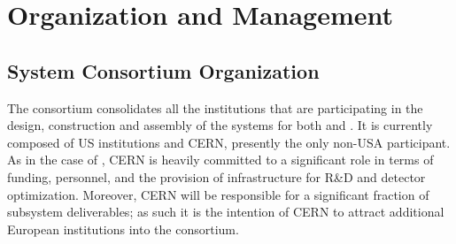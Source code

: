 


\section{Organization and Management}
\label{sec:fdsp-hv-org}


\subsection{ System Consortium Organization}
\label{sec:fdsp-hv-org-consortium}

The consortium consolidates all the institutions that are participating in the design, construction and assembly of the  systems for both   and . It is currently composed of US institutions and CERN, presently the only non-USA participant. As in the case of , CERN is heavily committed to a significant role in terms of funding, personnel, 
 and the provision of infrastructure for R\&D and detector optimization. Moreover, CERN will be responsible for a significant fraction of subsystem deliverables; as such it is the intention of CERN to attract additional European institutions into the consortium.





